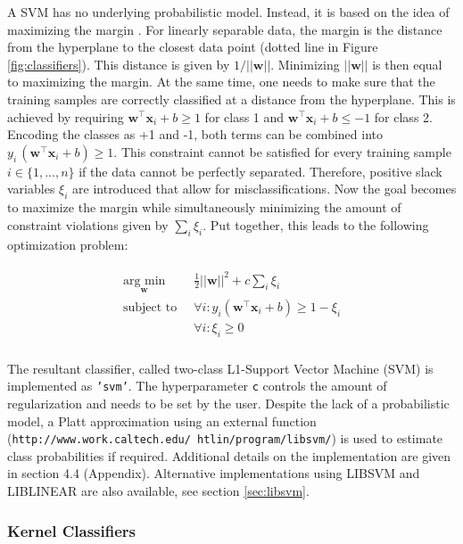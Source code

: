 \documentclass[utf8]{frontiersSCNS} %
\newcommand{\w}{\mathbf{w}}
\newcommand{\x}{\mathbf{x}}
\newcommand{\ttt}[1]{\texttt{#1}}
\begin{document}
A SVM has no underlying probabilistic model. Instead, it is based on the idea of maximizing the margin \citep{Scholkopf2001LearningBeyond,Hearst1998SupportMachines}. For linearly separable data, the margin is the distance from the hyperplane to the closest data point (dotted line in Figure \ref{fig:classifiers}). This distance is given by $1/||\w||$. Minimizing $||\w||$ is then equal to maximizing the margin. At the same time, one needs to make sure that the training samples are correctly classified at a distance from the hyperplane. This is achieved by requiring
$\w^\top\x_i + b\ge 1$ for class 1 and $\w^\top\x_i + b\le -1$ for class 2. Encoding the classes as +1 and -1, both terms can be combined into $y_i\, (\w^\top\x_i + b) \ge 1$. This constraint cannot be satisfied for every training sample $i\in\{1,...,n\}$ if the data cannot be perfectly separated. Therefore, positive slack variables $\xi_i$ are introduced that allow for misclassifications. Now the goal becomes to maximize the margin while simultaneously minimizing the amount of constraint violations given by $\sum_i \xi_i$. Put together, this leads to the following optimization problem:

\begin{align}
\begin{split}
\label{eq:svm_primal}
\underset{\w}{\text{arg min}} &\ \frac{1}{2}||\w||^2 + c\sum_i \xi_i\\
\text{subject to } &\ \forall i: y_i (\w^\top\x_i + b) \ge 1 - \xi_i\\
&\ \forall i: \xi_i \ge 0\\
\end{split}
\end{align}

The resultant classifier, called two-class L1-Support Vector Machine (SVM) is implemented as \ttt{'svm'}. The hyperparameter \ttt{c} controls the amount of regularization and needs to be set by the user. Despite the lack of a probabilistic model, a Platt approximation using an external function (\ttt{http://www.work.caltech.edu/~htlin/program/libsvm/}) is used to estimate class probabilities if required. Additional details on the implementation are given in section 4.4 (Appendix). Alternative implementations using LIBSVM and LIBLINEAR are also available, see section \ref{sec:libsvm}.

\subsubsection{Kernel Classifiers}\label{sec:kernel-methods}
\end{document}
